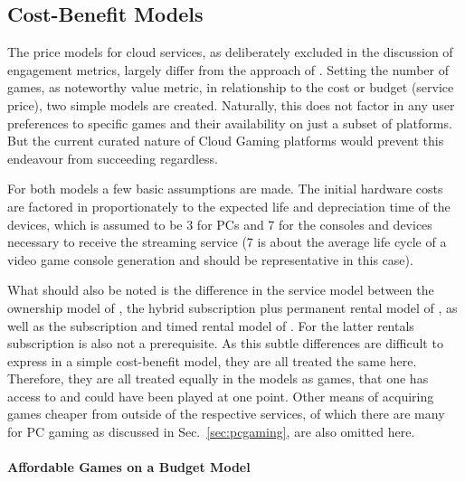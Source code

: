 \subsection{Cost-Benefit Models}


The price models for cloud services, as deliberately excluded in the discussion of engagement metrics, largely differ from the approach of \steam. Setting the number of games, as noteworthy value metric, in relationship to the cost or budget (service price), two simple models are created. Naturally, this does not factor in any user preferences to specific games and their availability on just a subset of platforms. But the current curated nature of Cloud Gaming platforms would prevent this endeavour from succeeding regardless.



For both models a few basic assumptions are made. The initial hardware costs are factored in proportionately to the expected life and depreciation time of the devices, which is assumed to be \SI{3}{\year} for PCs and \SI{7}{\year} for the consoles and devices necessary to receive the streaming service (\SI{7}{\year} is about the average life cycle of a video game console generation and should be representative in this case).

What should also be noted is the difference in the service model between the ownership model of \steam, the hybrid subscription plus permanent rental model of \gfnow, as well as the subscription and timed rental model of \psnow. For the latter rentals subscription is also not a prerequisite. As this subtle differences are difficult to express in a simple cost-benefit model, they are all treated the same here. Therefore, they are all treated equally in the models as games, that one has access to and could have been played at one point. Other means of acquiring games cheaper from outside of the respective services, of which there are many for PC gaming as discussed in Sec.~\ref{sec:pcgaming}, are also omitted here.

\paragraph{Affordable Games on a Budget Model}

